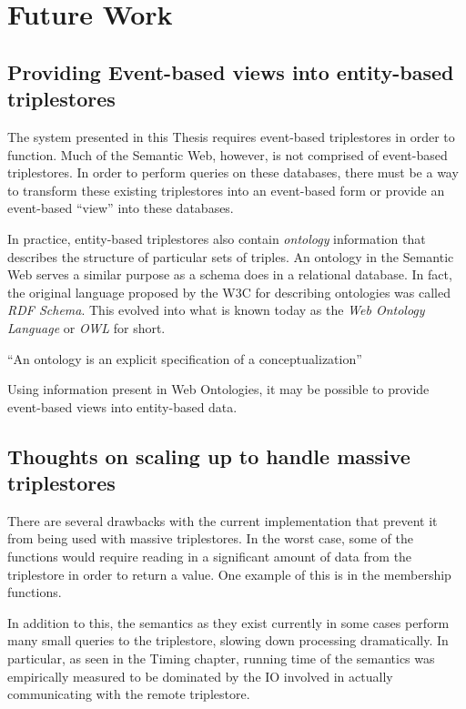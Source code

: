 \documentclass[../main.tex]{subfiles}
\begin{document}
	
\chapter{Future Work}


\section{Providing Event-based views into entity-based triplestores}

The system presented in this Thesis requires event-based triplestores in order to function.  Much of the Semantic Web, however, is not comprised of event-based triplestores.  In order to perform queries on these databases, there must be a way to transform these existing triplestores into an event-based form or provide an event-based ``view'' into these databases. 

In practice, entity-based triplestores also contain {\em ontology} information that describes the structure of particular sets of triples.  An ontology in the Semantic Web
serves a similar purpose as a schema does in a relational database.  In fact, the original language proposed by the W3C for describing ontologies was called {\em RDF Schema}.  This evolved into what is known today as the {\em Web Ontology Language} or {\em OWL} for short.

\begin{definition}[Ontology]
	``An ontology is an explicit specification of a conceptualization'' \cite{gruber}
\end{definition}

Using information present in Web Ontologies, it may be possible to provide event-based views into entity-based data.

\section{Thoughts on scaling up to handle massive triplestores}

There are several drawbacks with the current implementation that prevent it from being used with massive triplestores.
In the worst case, some of the functions would require reading in a significant amount of data from the triplestore in order to return a value.  One example of this is in the membership functions.

In addition to this, the semantics as they exist currently in some cases perform many small queries to the triplestore, slowing down processing dramatically.
In particular, as seen in the Timing chapter, running time of the semantics was empirically measured to be dominated by the IO involved in actually communicating
with the remote triplestore.
\end{document}
